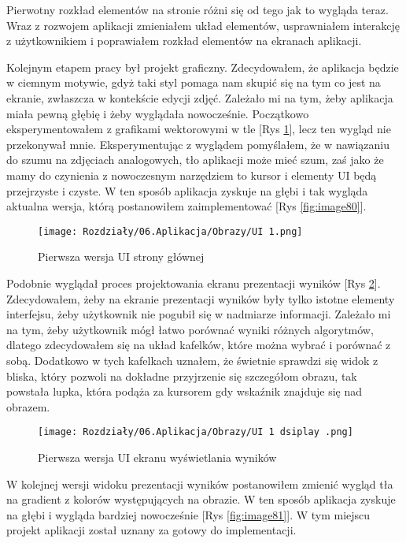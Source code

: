 Pierwotny rozkład elementów na stronie różni się od tego jak to wygląda teraz. Wraz z rozwojem aplikacji zmieniałem układ elementów, usprawniałem interakcję z użytkownikiem i poprawiałem rozkład elementów na ekranach aplikacji.

Kolejnym etapem pracy był projekt graficzny. Zdecydowałem, że aplikacja będzie w ciemnym motywie, gdyż taki styl pomaga nam skupić się na tym co jest na ekranie, zwłaszcza w kontekście edycji zdjęć. Zależało mi na tym, żeby aplikacja miała pewną głębię i żeby wyglądała nowocześnie. Początkowo eksperymentowałem z grafikami wektorowymi w tle [Rys \ref{fig:image85}], lecz ten wygląd nie przekonywał mnie. Eksperymentując z wyglądem pomyślałem, że w nawiązaniu do szumu na zdjęciach analogowych, tło aplikacji może mieć szum, zaś jako że mamy do czynienia z nowoczesnym narzędziem to kursor i elementy UI będą przejrzyste i czyste. W ten sposób aplikacja zyskuje na głębi i tak wygląda aktualna wersja, którą postanowiłem zaimplementować [Rys \ref{fig:image80}].

\begin{figure}[H]
    \centering
    \texttt{[image: Rozdziały/06.Aplikacja/Obrazy/UI 1.png]}  
    \caption{Pierwsza wersja UI strony głównej}
    \label{fig:image85}
\end{figure}

Podobnie wyglądał proces projektowania ekranu prezentacji wyników [Rys \ref{fig:image86}]. Zdecydowałem, żeby na ekranie prezentacji wyników były tylko istotne elementy interfejsu, żeby użytkownik nie pogubił się w nadmiarze informacji. Zależało mi na tym, żeby użytkownik mógł łatwo porównać wyniki różnych algorytmów, dlatego zdecydowałem się na układ kafelków, które można wybrać i porównać z sobą. Dodatkowo w tych kafelkach uznałem, że świetnie sprawdzi się widok z bliska, który pozwoli na dokładne przyjrzenie się szczegółom obrazu, tak powstała lupka, która podąża za kursorem gdy wskaźnik znajduje się nad obrazem. 

\begin{figure}[H]
    \centering
    \texttt{[image: Rozdziały/06.Aplikacja/Obrazy/UI 1 dsiplay .png]}  
    \caption{Pierwsza wersja UI ekranu wyświetlania wyników}
    \label{fig:image86}
\end{figure}

W kolejnej wersji widoku prezentacji wyników postanowiłem zmienić wygląd tła na gradient z kolorów występujących na obrazie. W ten sposób aplikacja zyskuje na głębi i wygląda bardziej nowocześnie [Rys \ref{fig:image81}]. W tym miejscu projekt aplikacji został uznany za gotowy do implementacji.



